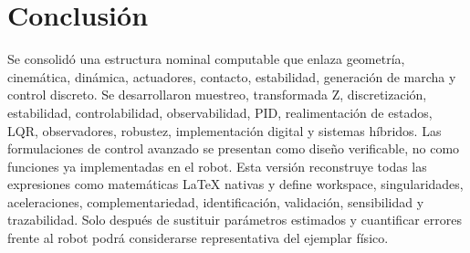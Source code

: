 \documentclass[11pt,letterpaper]{article}
\begin{document}
\section{Conclusión}
Se consolidó una estructura nominal computable que enlaza geometría,
cinemática, dinámica, actuadores, contacto, estabilidad, generación de marcha y
control discreto. Se desarrollaron muestreo, transformada Z, discretización,
estabilidad, controlabilidad, observabilidad, PID, realimentación de estados,
LQR, observadores, robustez, implementación digital y sistemas híbridos. Las
formulaciones de control avanzado se presentan como diseño verificable, no como
funciones ya implementadas en el robot.
Esta versión reconstruye todas las expresiones como matemáticas LaTeX nativas y
define workspace, singularidades, aceleraciones, complementariedad,
identificación, validación, sensibilidad y trazabilidad. Solo después de
sustituir parámetros estimados y cuantificar errores frente al robot podrá
considerarse representativa del ejemplar físico.
\end{document}
